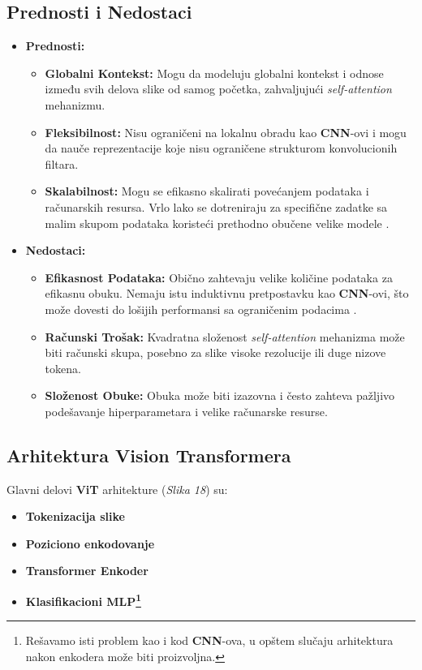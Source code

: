 \documentclass[12pt]{article}
\begin{document}
   \subsection{Prednosti i Nedostaci}
   \begin{itemize}
      \item \textbf{Prednosti:}
      \begin{itemize}
          \item \textbf{Globalni Kontekst:} Mogu da modeluju globalni kontekst 
          i odnose između svih delova slike od samog početka, zahvaljujući \textit{self-attention} 
          mehanizmu.
          \item \textbf{Fleksibilnost:} Nisu ograničeni na lokalnu obradu kao \textbf{CNN}-ovi i 
          mogu da nauče reprezentacije koje nisu ograničene strukturom konvolucionih filtara.
          \item \textbf{Skalabilnost:} Mogu se efikasno skalirati povećanjem podataka i računarskih 
          resursa. Vrlo lako se dotreniraju za specifične zadatke sa malim skupom podataka 
          koristeći prethodno obučene velike modele \cite{vit}.
      \end{itemize}
      \item \textbf{Nedostaci:}
      \begin{itemize}
         \item \textbf{Efikasnost Podataka:} Obično zahtevaju velike količine 
         podataka za efikasnu obuku. Nemaju istu induktivnu pretpostavku kao \textbf{CNN}-ovi, 
         što može dovesti do lošijih performansi sa ograničenim podacima \cite{vit}.
         \item \textbf{Računski Trošak:} Kvadratna složenost \textit{self-attention} mehanizma 
         može biti računski skupa, posebno za slike visoke rezolucije ili duge nizove tokena.
         \item \textbf{Složenost Obuke:} Obuka može biti izazovna i često zahteva pažljivo 
         podešavanje hiperparametara i velike računarske resurse.
      \end{itemize}
  \end{itemize}

  \newpage
  \subsection{Arhitektura Vision Transformera}
  Glavni delovi \textbf{ViT} \cite{vit} arhitekture (\textit{Slika 18}) su:
   \begin{itemize}
         \item \textbf{Tokenizacija slike}
         \item \textbf{Poziciono enkodovanje}
         \item \textbf{Transformer Enkoder}
         \item \textbf{Klasifikacioni MLP\footnote{Rešavamo isti problem kao i kod \textbf{CNN}-ova, u opštem slučaju arhitektura nakon enkodera može biti proizvoljna.}}
   \end{itemize}
\end{document}
